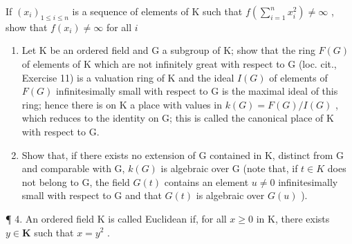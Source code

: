 If \((x_{i})_{1\leqslant i\leqslant n}\) is a sequence of elements of K such that \(f\left(\sum_{i = 1}^{n}x_{i}^{2}\right)\neq \infty\) , show that \(f(x_{i})\neq \infty\) for all \(i\)

\begin{enumerate}
\def\labelenumi{(\alph{enumi})}
\setcounter{enumi}{1}
\item
  Let K be an ordered field and G a subgroup of K; show that the ring \(F(G)\) of elements of K which are not infinitely great with respect to G (loc. cit., Exercise 11) is a valuation ring of K and the ideal \(I(G)\) of elements of \(F(G)\) infinitesimally small with respect to G is the maximal ideal of this ring; hence there is on K a place with values in \(k(G) = F(G)/I(G)\) , which reduces to the identity on G; this is called the canonical place of K with respect to G.
\item
  Show that, if there exists no extension of G contained in K, distinct from G and comparable with G, \(k(G)\) is algebraic over G (note that, if \(t \in K\) does not belong to G, the field \(G(t)\) contains an element \(u \neq 0\) infinitesimally small with respect to G and that \(G(t)\) is algebraic over \(G(u)\) ).
\end{enumerate}

¶ 4. An ordered field K is called Euclidean if, for all \(x \geqslant 0\) in K, there exists \(y \in \mathbf{K}\) such that \(x = y^2\) .

